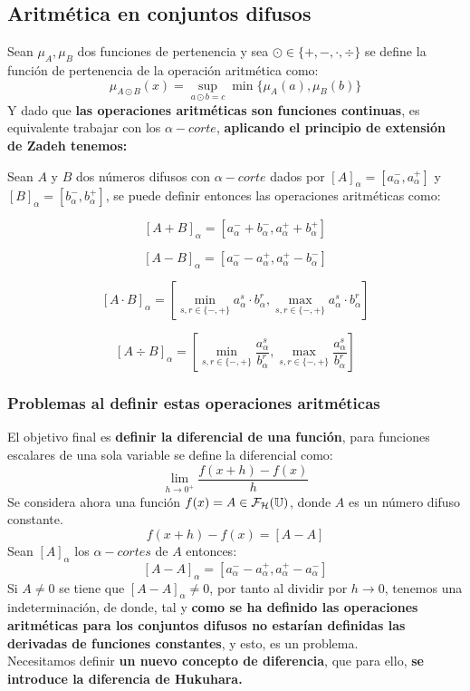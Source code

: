 \subsection{Aritmética en conjuntos difusos}
Sean $\mu_A, \mu_B$ dos funciones de pertenencia y sea $\odot \in \{+, -, \cdot, \div\}$ se define la función de pertenencia de la operación aritmética como:
$$
\mu_{A \odot B}(x) = \sup_{a \odot b = c} \min\{\mu_A(a), \mu_B(b)\}
$$
Y dado que \textbf{las operaciones aritméticas son funciones continuas}, es equivalente trabajar con los $\alpha-corte$, \textbf{aplicando el principio de extensión de Zadeh tenemos:}

Sean $A$ y $B$ dos números difusos con $\alpha-corte$ dados por $[A]_\alpha=[a_\alpha^-, a_\alpha^+]$ y $[B]_\alpha=[b_\alpha^-, b_\alpha^+]$, se puede definir entonces las operaciones aritméticas como:

$$
[A+B]_\alpha = [a_\alpha^- + b_\alpha^-, a_\alpha^+ + b_\alpha^+]
$$

$$
[A-B]_\alpha = [a_\alpha^- - a_\alpha^+, a_\alpha^+ - b_\alpha^-]
$$

$$
[A \cdot B]_\alpha = \left[ \min_{s, r \in \{-, +\}} a_\alpha^s \cdot b_\alpha^r, \max_{s, r \in \{-, +\}} a_\alpha^s \cdot b_\alpha^r\right]
$$

$$
[A \div B]_\alpha = \left[ \min_{s, r \in \{-, +\}} \frac{a_\alpha^s}{b_\alpha^r}, \max_{s, r \in \{-, +\}} \frac{a_\alpha^s}{b_\alpha^r}\right]
$$

\subsubsection{Problemas al definir estas operaciones aritméticas}
El objetivo final es \textbf{definir la diferencial de una función}, para funciones escalares de una sola variable se define la diferencial como:
$$
\lim\limits_{h\rightarrow 0^+} \frac{f(x+h) - f(x)}{h}
$$
Se considera ahora una función $f(x)=A\in \mathcal{F}_\mathcal{H}(\mathbb U)$, donde $A$ es un número difuso constante. \\
$$f(x+h) - f(x)=[A-A]$$
Sean $[A]_\alpha$ los $\alpha-cortes$ de $A$ entonces:
$$
[A-A]_\alpha = [a_\alpha^- - a_\alpha^+, a_\alpha^+ - a_\alpha^-]
$$
Si $A\neq 0$ se tiene que $[A-A]_\alpha \neq 0$, por tanto al dividir por $h \rightarrow 0$, tenemos una indeterminación, de donde, tal y \textbf{como se ha definido las operaciones aritméticas para los conjuntos difusos no estarían definidas las derivadas de funciones constantes}, y esto, es un problema. \\
Necesitamos definir \textbf{un nuevo concepto de diferencia}, que para ello, \textbf{se introduce la diferencia de Hukuhara.}

